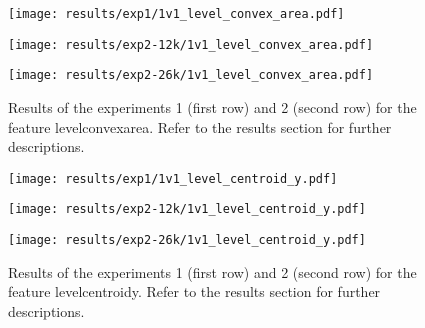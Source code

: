 \begin{figure}[h!]
	\centering
	\begin{minipage}{0.4\linewidth}
		\texttt{[image: results/exp1/1v1\_level\_convex\_area.pdf]}
	\end{minipage}
	
	\begin{minipage}{0.4\linewidth}
		\texttt{[image: results/exp2-12k/1v1\_level\_convex\_area.pdf]}
	\end{minipage}
	\begin{minipage}{0.4\linewidth}
		\texttt{[image: results/exp2-26k/1v1\_level\_convex\_area.pdf]}
	\end{minipage}
	
	\caption[ Results: Feature level\textunderscore convex\textunderscore area]{ Results of the experiments 1 (first row) and 2 (second row) for the feature level\textunderscore convex\textunderscore area. Refer to the results section for further descriptions. }
	\label{fig:appendix_level_convex_area}
\end{figure}

\begin{figure}[h!]
	\centering
	\begin{minipage}{0.4\linewidth}
		\texttt{[image: results/exp1/1v1\_level\_centroid\_y.pdf]}
	\end{minipage}
	
	\begin{minipage}{0.4\linewidth}
		\texttt{[image: results/exp2-12k/1v1\_level\_centroid\_y.pdf]}
	\end{minipage}
	\begin{minipage}{0.4\linewidth}
		\texttt{[image: results/exp2-26k/1v1\_level\_centroid\_y.pdf]}
	\end{minipage}
	
	\caption[ Results: Feature level\textunderscore centroid\textunderscore y]{ Results of the experiments 1 (first row) and 2 (second row) for the feature level\textunderscore centroid\textunderscore y. Refer to the results section for further descriptions. }
	\label{fig:appendix_level_centroid_y}
\end{figure}
\newpage 


